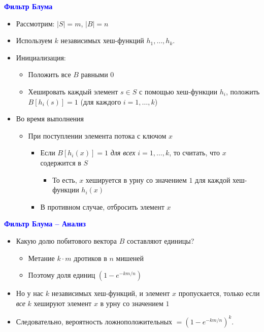 \documentclass[landscape]{slides}
\begin{document}
\begin{normalsize}
\begin{slide}
\textbf{\textcolor{blue}{Фильтр Блума}}

\begin{itemize}
\item Рассмотрим: $|S| = m$, $|B|=n$
\item Используем $k$ независимых хеш-функций $h_1,\ldots,h_k$.
\item Инициализация:
  \begin{itemize}
  \item Положить все $B$ равными $0$
  \item Хешировать каждый элемент $s\in S$ с помощью хеш-функции $h_i$,
  положить $B[h_i(s)]=1$ (для каждого $i=1,\ldots,k$)
  \end{itemize}
\item Во время выполнения
  \begin{itemize}
  \item При поступлении элемента потока с ключом $x$
    \begin{itemize}
    \item Если $B[h_i(x)]=1$ {\em для всех} $i=1,\ldots,k$, то считать, что $x$ содержится в $S$
      \begin{itemize}
      \item То есть, $x$ хешируется в урну со значением $1$ для каждой хеш-функции $h_i(x)$
      \end{itemize}
    \item В противном случае, отбросить элемент $x$
    \end{itemize}
  \end{itemize}
\end{itemize}
\end{slide}

\begin{slide}
\textbf{\textcolor{blue}{Фильтр Блума -- Анализ}}

\begin{itemize}
\item Какую долю побитового вектора $B$ составляют единицы?
  \begin{itemize}
  \item Метание $k\cdot m$ дротиков в $n$ мишеней
  \item Поэтому доля единиц $(1-e^{-km/n})$
  \end{itemize}
\item Но у нас $k$ независимых хеш-функций, и элемент $x$ пропускается, только если {\em все} $k$ хешируют элемент $x$ в урну со значением $1$
\item Следовательно, вероятность ложноположительных $=(1-e^{-km/n})^k$.
\end{itemize}
\end{slide}


\end{normalsize}
\end{document}
